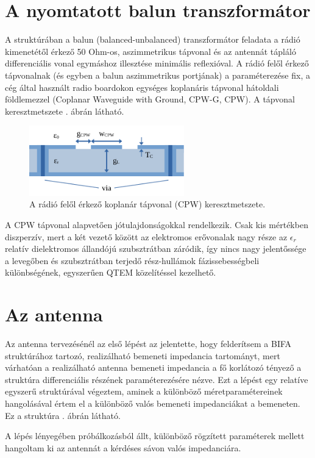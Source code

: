 \section{A nyomtatott balun transzformátor}
	A struktúrában a balun (balanced-unbalanced) transzformátor feladata a rádió kimenetétől érkező 50 Ohm-os, aszimmetrikus tápvonal és az antennát tápláló differenciális vonal egymáshoz illesztése minimális reflexióval. A rádió felől érkező tápvonalnak (és egyben a balun aszimmetrikus portjának) a paraméterezése fix, a cég által használt radio boardokon egységes koplanáris tápvonal hátoldali földlemezzel (Coplanar Waveguide with Ground, CPW-G, CPW). A tápvonal keresztmetszete . ábrán látható.
\begin{figure}[h]
	\centering
	\includegraphics[width=0.6\textwidth]{kep/cpw.pdf}
	\caption{A rádió felől érkező koplanár tápvonal (CPW) keresztmetszete.}
	\label{fig:cpw}
\end{figure}
	A CPW tápvonal alapvetően jótulajdonságokkal rendelkezik. Csak kis mértékben diszperzív, mert a két vezető között az elektromos erővonalak nagy része az $\epsilon_r$ relatív dielektromos állandójú szubsztrátban záródik, így nincs nagy jelentőssége a levegőben és szubsztrátban terjedő rész-hullámok fázissebességbeli különbségének, egyszerűen QTEM közelítéssel kezelhető.
\section{Az antenna}
	Az antenna tervezésénél az első lépést az jelentette, hogy felderítsem a BIFA struktúrához tartozó, realizálható bemeneti impedancia tartományt, mert várhatóan a realizálható antenna bemeneti impedancia a fő korlátozó tényező a struktúra differenciális részének paraméterezésére nézve. Ezt a lépést egy relatíve egyszerű struktúrával végeztem, aminek a különböző méretparamétereinek hangolásával értem el a különböző valós bemeneti impedanciákat a bemeneten. Ez a struktúra . ábrán látható.
\par A lépés lényegében próbálkozásból állt, különböző rögzített paraméterek mellett hangoltam ki az antennát a kérdéses sávon valós impedanciára.